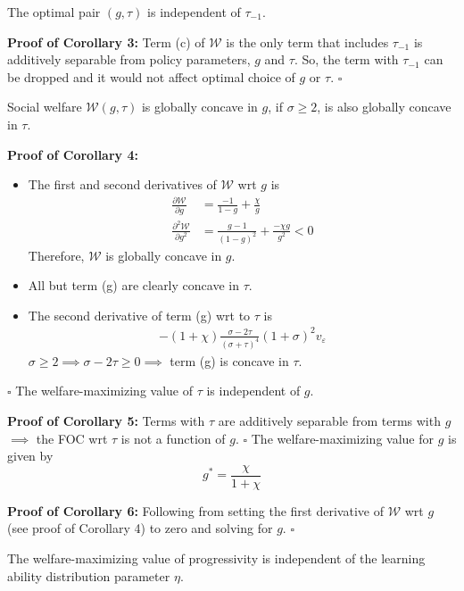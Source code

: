 \documentclass{article}
\begin{document}
{
\corollary The optimal pair $(g, \tau)$ is independent of $\tau_{-1}$.
}

\bigskip

\textbf{Proof of Corollary 3:} Term (c) of $\mathcal{W}$ is the only term that includes $\tau_{-1}$ is additively separable from policy parameters, $g$ and $\tau$. So, the term with $\tau_{-1}$ can be dropped and it would not affect optimal choice of $g$ or $\tau$. $\square$

{
\corollary Social welfare $\mathcal{W}(g, \tau)$ is globally concave in $g$, if $\sigma \ge 2$, is also globally concave in $\tau$.
}

\bigskip

\textbf{Proof of Corollary 4:} 
\begin{itemize}
\item The first and second derivatives of $\mathcal{W}$ wrt $g$ is
\begin{align*}
\frac{\partial \mathcal{W}}{\partial g} &= \frac{-1}{1-g} + \frac{\chi}{g}\\
\frac{\partial^2 \mathcal{W}}{\partial g^2} &= \frac{g - 1}{(1-g)^2} + \frac{-\chi g}{g^2} < 0
\end{align*}
Therefore, $\mathcal{W}$ is globally concave in $g$.
\item All but term (g) are clearly concave in $\tau$.
\item The second derivative of term (g) wrt to $\tau$ is
\begin{align*}
-(1 + \chi) \frac{\sigma - 2 \tau}{(\sigma + \tau)^4} (1+\sigma)^2 v_\varepsilon
\end{align*}
$\sigma \ge 2 \implies \sigma - 2 \tau \ge 0 \implies$ term (g) is concave in $\tau$.
\end{itemize}
$\square$
{
\corollary The welfare-maximizing value of $\tau$ is independent of $g$.
}

\bigskip

\textbf{Proof of Corollary 5:} Terms with $\tau$ are additively separable from terms with $g$ $\implies$ the FOC wrt $\tau$ is not a function of $g$. $\square$
{
\corollary The welfare-maximizing value for $g$ is given by
$$
g^* = \frac{\chi}{1+\chi}
$$
}

\bigskip

\textbf{Proof of Corollary 6:} Following from setting the first derivative of $\mathcal{W}$ wrt $g$ (see proof of Corollary 4) to zero and solving for $g$. $\square$

{
\corollary The welfare-maximizing value of progressivity is independent of the learning ability distribution parameter $\eta$.
}
\end{document}
